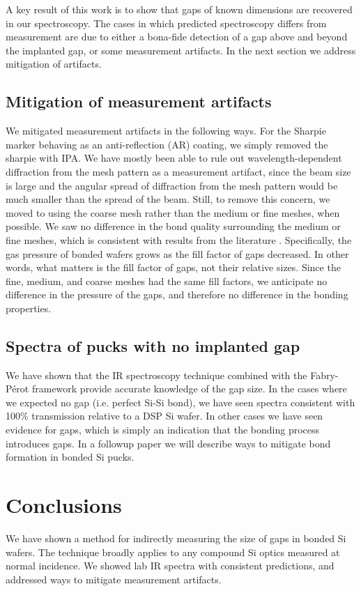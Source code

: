 \documentclass[osajnl,preprint,showpacs,superscriptaddress,12pt]{revtex4-1} %
\begin{document}
A key result of this work is to show that gaps of known dimensions are recovered in our spectroscopy.  The cases in which predicted spectroscopy differs from measurement are due to either a bona-fide detection of a gap above and beyond the implanted gap, or some measurement artifacts.  In the next section we address mitigation of artifacts.

\subsection{Mitigation of measurement artifacts}
We mitigated measurement artifacts in the following ways.  For the Sharpie marker behaving as an anti-reflection (AR) coating, we simply removed the sharpie with IPA.  We have mostly been able to rule out wavelength-dependent diffraction from the mesh pattern as a measurement artifact, since the beam size is large and the angular spread of diffraction from the mesh pattern would be much smaller than the spread of the beam.  Still, to remove this concern, we moved to using the coarse mesh rather than the medium or fine meshes, when possible.  We saw no difference in the bond quality surrounding the medium or fine meshes, which is consistent with results from the literature \cite{1992JEMat..21..669M}.  Specifically, the gas pressure of bonded wafers grows as the fill factor of gaps decreased.  In other words, what matters is the fill factor of gaps, not their relative sizes.  Since the fine, medium, and coarse meshes had the same fill factors, we anticipate no difference in the pressure of the gaps, and therefore no difference in the bonding properties.


\subsection{Spectra of pucks with no implanted gap}
We have shown that the IR spectroscopy technique combined with the Fabry-P\'{e}rot framework provide accurate knowledge of the gap size.  In the cases where we expected no gap (i.e. perfect Si-Si bond), we have seen spectra consistent with 100\% transmission relative to a DSP Si wafer.  In other cases we have seen evidence for gaps, which is simply an indication that the bonding process introduces gaps.  In a followup paper we will describe ways to mitigate bond formation in bonded Si pucks.

\section{Conclusions}
We have shown a method for indirectly measuring the size of gaps in bonded Si wafers.  The technique broadly applies to any compound Si optics measured at normal incidence.  We showed lab IR spectra with consistent predictions, and addressed ways to mitigate measurement artifacts. 
\end{document}
